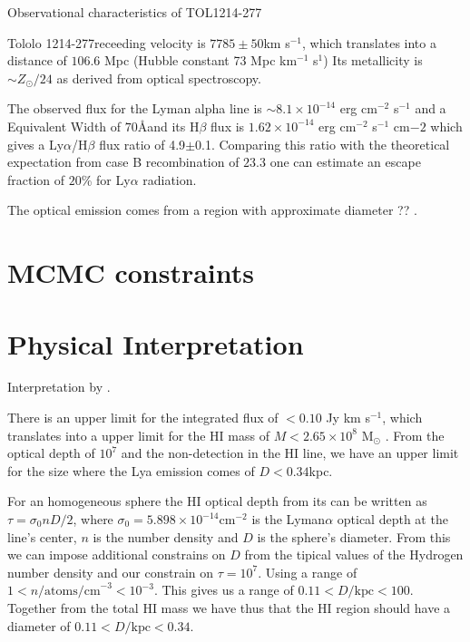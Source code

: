 \documentclass[a4paper, usenatbib, 12pt]{article}
\newcommand{\tol}{Tololo 1214-277}
\begin{document}
{\begin{table}
\caption{Observational characteristics of TOL1214-277
  \cite{Thuan97}\\} 
\end{table}

\tol receeding velocity is $7785\pm 50$km s$^{-1}$, which translates
into a distance of $106.6$ Mpc (Hubble constant 73 Mpc km$^{-1}$
s$^{1}$)
Its metallicity is $\sim Z_{\odot}/24$ \cite{Izotov04} as derived from optical
spectroscopy. 

The observed flux for the Lyman alpha line is $\sim
8.1\times 10^{-14}$ erg cm$^{-2}$ s$^{-1}$ \cite{Thuan97}
and a Equivalent Width of $70$\AA and its H$\beta$ flux is 
$1.62\times 10^{-14}$ erg cm$^{-2}$ s$^{-1}$ cm${-2}$
\cite{Izotov04} which gives a Ly$\alpha$/H$\beta$ flux ratio of
4.9$\pm$0.1. 
Comparing this ratio with the theoretical expectation from case B
recombination of $23.3$ \cite{Hummer1987} one can estimate an escape
fraction of $20$\% for Ly$\alpha$ radiation.

The optical emission  comes from a   region with approximate diameter
?? \cite{Fricke01}. 

\section*{MCMC constraints}

\section*{Physical Interpretation}

Interpretation by \cite{mashesse03}.

There is an upper limit for the  
integrated flux of $<0.10$ Jy km s$^{-1}$, which translates into a
upper limit for the HI mass of $M<2.65\times 10^{8}$ M$_{\odot}$
\cite{pustilnikmartin07}. 
From the optical depth of $10^7$ and the non-detection in the HI line,
we have an upper limit for the size where the Lya emission comes of
$D<0.34$kpc. 

 For an homogeneous sphere the HI optical depth from its can be
 written as $\tau = \sigma_0 n D/2$, where $\sigma_0=5.898\times
10^{-14}$cm$^{-2}$ is the Lyman$\alpha$  optical depth at the 
line's center, $n$ is the number density and $D$ is the sphere's
diameter. 
From this we can impose additional constrains on $D$ from the tipical
values of the Hydrogen number density and our constrain on
$\tau=10^{7}$.  Using a range of $1<n/\mathrm{atoms/cm}^{-3} <
10^{-3}$. This gives us a range of $0.11 < D/\mathrm{kpc}<100$. 
Together from the total HI mass we have thus that the HI region should
have a diameter of $0.11 < D/\mathrm{kpc}<0.34$.



}
\end{document}

